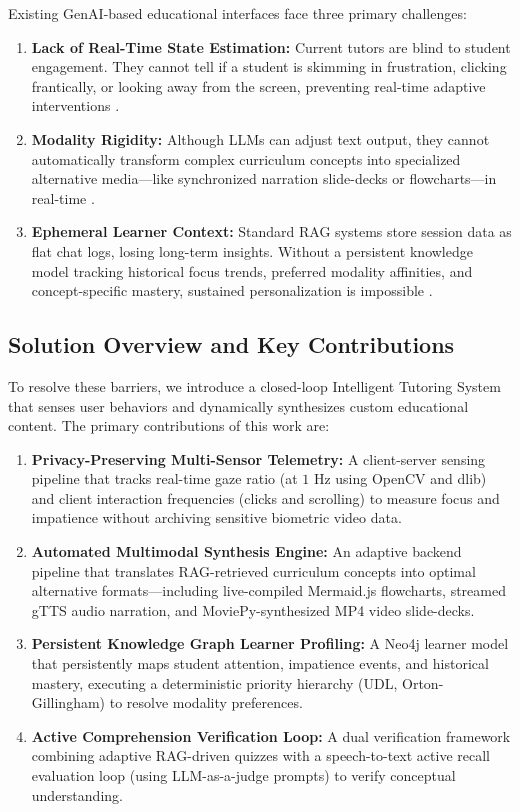 \documentclass[final,5p,times,twocolumn,authoryear]{elsarticle}
\begin{document}
Existing GenAI-based educational interfaces face three primary challenges:
\begin{enumerate}
    \item \textbf{Lack of Real-Time State Estimation:} Current tutors are blind to student engagement. They cannot tell if a student is skimming in frustration, clicking frantically, or looking away from the screen, preventing real-time adaptive interventions \cite{21}.
    \item \textbf{Modality Rigidity:} Although LLMs can adjust text output, they cannot automatically transform complex curriculum concepts into specialized alternative media—like synchronized narration slide-decks or flowcharts—in real-time \cite{10, 11}.
    \item \textbf{Ephemeral Learner Context:} Standard RAG systems store session data as flat chat logs, losing long-term insights. Without a persistent knowledge model tracking historical focus trends, preferred modality affinities, and concept-specific mastery, sustained personalization is impossible \cite{13}.
\end{enumerate}

\subsection{Solution Overview and Key Contributions}
\label{subsec:solution_contributions}

To resolve these barriers, we introduce a closed-loop Intelligent Tutoring System that senses user behaviors and dynamically synthesizes custom educational content. The primary contributions of this work are:
\begin{enumerate}
    \item \textbf{Privacy-Preserving Multi-Sensor Telemetry:} A client-server sensing pipeline that tracks real-time gaze ratio (at $1\text{ Hz}$ using OpenCV and dlib) and client interaction frequencies (clicks and scrolling) to measure focus and impatience without archiving sensitive biometric video data.
    \item \textbf{Automated Multimodal Synthesis Engine:} An adaptive backend pipeline that translates RAG-retrieved curriculum concepts into optimal alternative formats—including live-compiled Mermaid.js flowcharts, streamed gTTS audio narration, and MoviePy-synthesized MP4 video slide-decks.
    \item \textbf{Persistent Knowledge Graph Learner Profiling:} A Neo4j learner model that persistently maps student attention, impatience events, and historical mastery, executing a deterministic priority hierarchy (UDL, Orton-Gillingham) to resolve modality preferences.
    \item \textbf{Active Comprehension Verification Loop:} A dual verification framework combining adaptive RAG-driven quizzes with a speech-to-text active recall evaluation loop (using LLM-as-a-judge prompts) to verify conceptual understanding.
\end{enumerate}
\end{document}
